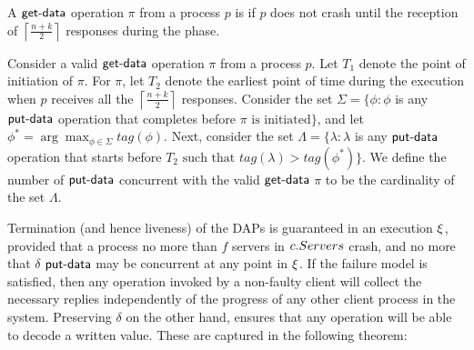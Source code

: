 \begin{definition}
A $\act{get-data}$  operation $\pi$ from a process $p$ is   if 
$p$ does not crash until the reception of $\left\lceil \frac{n+k}{2} \right\rceil$ responses during the{\GetData} phase. 
\end{definition}
					
				
				\begin{definition} \label{defn:concurrent}
					Consider a valid $\act{get-data}$ operation $\pi$ from a process $p$. 
					Let $T_1$ denote the point of initiation of $\pi$. For $\pi$, let $T_2$ denote the earliest point of time during the execution when $p$ 
					receives all the $\left\lceil \frac{n+k}{2} \right\rceil$ responses.
					Consider the set $\Sigma = \{ \phi: \phi$ is any $\act{put-data}$ operation that completes before $\pi \text{ is initiated} \}$, and let $\phi^* = \arg\max_{\phi \in \Sigma}tag(\phi)$. Next, consider the set $\Lambda = \{\lambda:  \lambda$  is any $\act{put-data}$ operation that starts before $T_2 \text{ such that } tag(\lambda) > tag(\phi^*)\}$. We define the number of $\act{put-data}$ concurrent with the valid $\act{get-data}$  $\pi$ to be the cardinality of the set $\Lambda$.
				\end{definition}
							
Termination (and hence liveness)  of the DAPs is guaranteed in an execution $\EX$, provided that a process 
	no more than $f$ servers in $c.Servers$ crash, and no more that $\delta$ $\act{put-data}$ may be concurrent at any point in $\EX$. 
	If the failure model is satisfied, then any operation invoked by a non-faulty client will collect the necessary replies
	independently of the progress of any other client process in the system. Preserving $\delta$ on the other hand,
	ensures that any operation will be able to decode a written value. These are captured in the following theorem:

